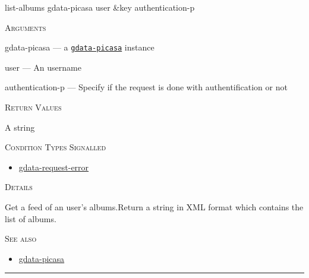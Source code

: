 \documentclass[a4paper]{report}
\begin{document}
    \label{cl-gdata-picasa__fun__list-albums}
    \begin{defun}[Function]
    list-albums gdata-picasa user &key authentication-p


    
    \bigskip
    \textsc{Arguments}

gdata-picasa
	--- a \hyperref[cl-gdata-picasa__class__gdata-picasa]{\texttt{gdata-picasa}}
   instance

user
	--- An username

authentication-p
	--- Specify if the request is done with authentification or not




    
    \bigskip
    \textsc{Return Values}

A string


      
    \bigskip
    \textsc{Condition Types Signalled}


 	
    \begin{itemize}
    
	  
    \item
    \hyperref[cl-gdata-service__class__gdata-request-error]{gdata-request-error}
    
	
    \end{itemize}
  
      


	
    \bigskip
    \textsc{Details}

Get a feed of an user's albums.Return a string in XML format which contains the list of albums.


      
    \bigskip
    \textsc{See also}


	
    \begin{itemize}
    
	  
    \item
    \hyperref[cl-gdata-picasa__class__gdata-picasa]{gdata-picasa}
    
	
    \end{itemize}
  
      


    
    \end{defun}
  
  

    \rule{\linewidth}{0.1mm}
    
\end{document}
